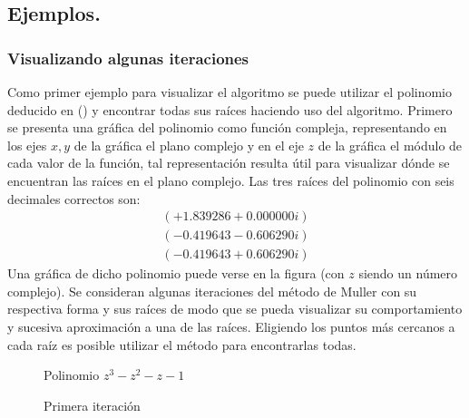 \subsection{Ejemplos.}
\subsubsection{Visualizando algunas iteraciones}
Como primer ejemplo para visualizar el algoritmo se puede utilizar el polinomio deducido en
() y encontrar todas sus raíces haciendo uso del algoritmo. Primero se presenta
una gráfica del polinomio como función compleja, representando en los ejes $x,y$ de la gráfica el plano
complejo y en el eje $z$ de la gráfica el módulo de cada valor de la función, tal representación resulta útil para visualizar
dónde se encuentran las raíces en el plano complejo. Las tres raíces del polinomio con seis decimales 
correctos son: 
\begin{align*}
    \left(+1.839286+0.000000i\right)\\(-0.419643-0.606290i)\\(-0.419643+0.606290i)
\end{align*}
Una gráfica de dicho polinomio puede verse en la figura  (con $z$ siendo un número complejo).
Se consideran algunas iteraciones del método de Muller con su respectiva forma y sus raíces de modo que se pueda visualizar
su comportamiento y sucesiva aproximación a una de las raíces. Eligiendo los puntos más cercanos a cada raíz
es posible utilizar el método para encontrarlas todas.\\
\begin{figure}
    \centering
    \caption{Polinomio $z^3-z^2-z-1$}
    \label{zero_poly}
\end{figure} 
\begin{figure}
    \centering
    \caption{Primera iteración}
    \label{first_poly}
\end{figure}
